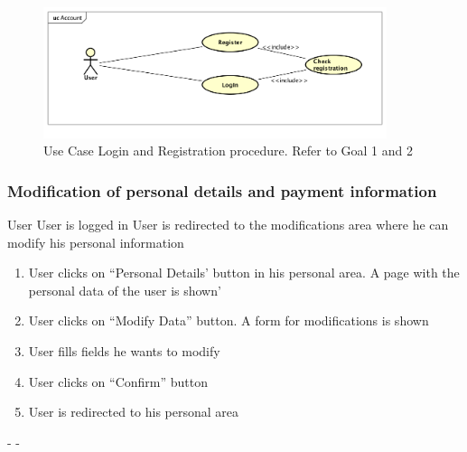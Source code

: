 \begin{figure}[h]

	\includegraphics[width=380px]{img/usecase_login_registration}
	\caption{Use Case Login and Registration procedure. Refer to Goal 1 and 2}
\end{figure}
\pagebreak


\subsubsection{Modification of personal details and payment information}
{User}
{}
{User is logged in}
{User is redirected to the modifications area where he can modify his personal information}
{
\begin{enumerate}
	\item User clicks on ``Personal Details' button in his personal area. A page with the personal data of the user is shown'
	\item User clicks on ``Modify Data'' button. A form for modifications is shown
	\item User fills fields he wants to modify
	\item User clicks on ``Confirm'' button
	\item User is redirected to his personal area
\end{enumerate}
}
{-}
{-}
\pagebreak


